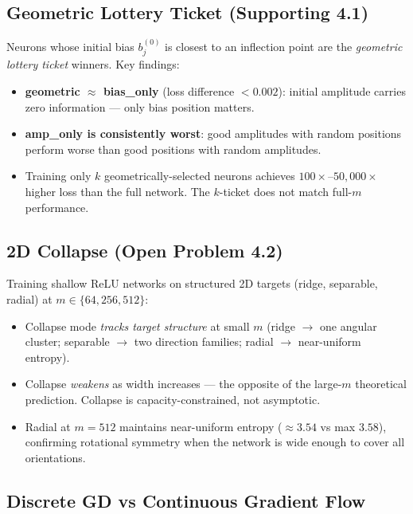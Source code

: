 \documentclass[11pt, letterpaper]{article}
\begin{document}
\subsection*{Geometric Lottery Ticket (Supporting 4.1)}

Neurons whose initial bias $b_j^{(0)}$ is closest to an inflection point are the
\emph{geometric lottery ticket} winners. Key findings:
\begin{itemize}[leftmargin=1.4em, itemsep=0pt]
  \item \textbf{geometric $\approx$ bias\_only} (loss difference $<0.002$): initial amplitude
        carries zero information --- only bias position matters.
  \item \textbf{amp\_only is consistently worst}: good amplitudes with random positions
        perform worse than good positions with random amplitudes.
  \item Training only $k$ geometrically-selected neurons achieves $100\times$--$50{,}000\times$
        higher loss than the full network. The $k$-ticket does not match full-$m$ performance.
\end{itemize}

\subsection*{2D Collapse (Open Problem 4.2)}

Training shallow ReLU networks on structured 2D targets (ridge, separable, radial) at
$m\in\{64,256,512\}$:
\begin{itemize}[leftmargin=1.4em, itemsep=0pt]
  \item Collapse mode \emph{tracks target structure} at small $m$ (ridge $\to$ one angular
        cluster; separable $\to$ two direction families; radial $\to$ near-uniform entropy).
  \item Collapse \emph{weakens} as width increases --- the opposite of the large-$m$
        theoretical prediction. Collapse is capacity-constrained, not asymptotic.
  \item Radial at $m=512$ maintains near-uniform entropy ($\approx 3.54$ vs max $3.58$),
        confirming rotational symmetry when the network is wide enough to cover all orientations.
\end{itemize}

\subsection*{Discrete GD vs Continuous Gradient Flow}
\end{document}
